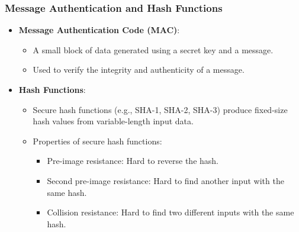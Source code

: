 \documentclass[12pt]{article}
\begin{document}
\subsubsection{Message Authentication and Hash Functions}
\begin{itemize}
    \item \textbf{Message Authentication Code (MAC)}:
    \begin{itemize}
        \item A small block of data generated using a secret key and a message.
        \item Used to verify the integrity and authenticity of a message.
    \end{itemize}
    \item \textbf{Hash Functions}:
    \begin{itemize}
        \item Secure hash functions (e.g., SHA-1, SHA-2, SHA-3) produce fixed-size hash values from variable-length input data.
        \item Properties of secure hash functions:
        \begin{itemize}
            \item Pre-image resistance: Hard to reverse the hash.
            \item Second pre-image resistance: Hard to find another input with the same hash.
            \item Collision resistance: Hard to find two different inputs with the same hash.
        \end{itemize}
    \end{itemize}
\end{itemize}
\end{document}
